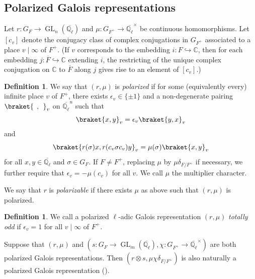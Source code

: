 \documentclass{amsart}
\theoremstyle{definition}
\newtheorem{definition}[theorem]{Definition}
\numberwithin{equation}{section} %
\newcommand{\GL}{\operatorname{GL}}
\newcommand{\Qlbar}{\ensuremath{\overline{\mathbb{Q}_\ell}}}
\newcommand{\bb}[1]{\mathbb{#1}}
\newcommand{\ol}[1]{\overline{#1}}
\begin{document}
\subsection{Polarized Galois representations}

Let \( r:G_F\to\GL_n(\Qlbar) \) and \( \mu: G_{F^+}\to\Qlbar^\times \) be continuous homomorphisms. Let \( [c_v] \) denote the conjugacy class of complex conjugations in \( G_{F^+} \) associated to a place \( v\mid\infty \) of \( F^+ \). (If \( v \) corresponds to the embedding \( i: F\hookrightarrow\bb{C} \), then for each embedding \( j:\ol{F}\hookrightarrow\bb{C} \) extending \( i \), the restricting of the unique complex conjugation on \( \bb{C} \) to \( \ol{F} \) along \( j \) gives rise to an element of \( [c_v] \).)

\begin{definition}
    We say that \( (r,\mu) \) is \emph{polarized} if for some (equivalently every) infinite place \( v \) of \( F^+ \), there exists \( \epsilon_v\in\{\pm 1 \} \) and a non-degenerate pairing \( \braket{\:\:,\:\:}_v \) on \( \Qlbar^n \) such that
    \[ \braket{x,y}_v=\epsilon_v\braket{y,x}_v \]
    and
    \[ \braket{r(\sigma)x,r(c_v\sigma c_v)y}_v = \mu(\sigma)\braket{x,y}_v \]
    for all \( x,y\in\Qlbar \) and \( \sigma\in G_F \). If \( F\neq F^+ \), replacing \( \mu \) by \( \mu\delta_{F/F^+} \) if necessary, we further require that \( \epsilon_v=-\mu(c_v) \) for all \( v \).
    We call $\mu$ the multiplier character.
    
    We say that $r$ is \emph{polarizable} if there exists $\mu$ as above such that $(r,\mu)$ is polarized.
\end{definition}

\begin{definition} \label{defn: totally odd}
    We call a polarized \( \ell \)-adic Galois representation \( (r,\mu) \) \emph{totally odd} if \( \epsilon_v=1 \) for all \( v\mid \infty \) of \( F^+ \).
\end{definition}

Suppose that $(r,\mu)$ and $(s: G_F \to \GL_m(\Qlbar),\chi: G_{F^+} \to \Qlbar^\times)$ are both polarized Galois representations.
Then $(r \otimes s, \mu \chi \delta_{F/F^+})$ is also naturally a polarized Galois representation (\cite[\S 1.1]{BLGGT14}).
\end{document}
